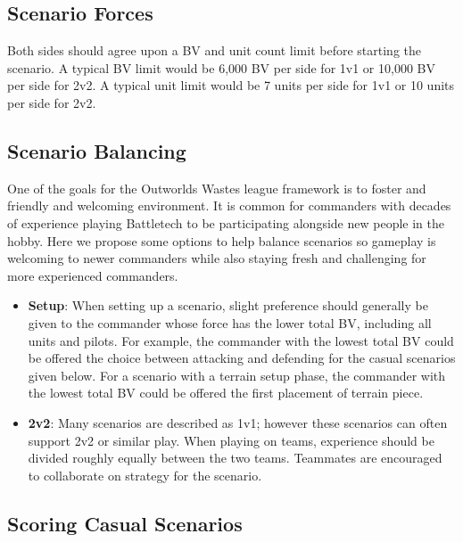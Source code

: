 \documentclass[UTF8]{article}
\begin{document}
\subsection{Scenario Forces}

Both sides should agree upon a BV and unit count limit before starting the scenario.
A typical BV limit would be 6,000 BV per side for 1v1 or 10,000 BV per side for 2v2.
A typical unit limit would be 7 units per side for 1v1 or 10 units per side for 2v2.\\

\subsection{Scenario Balancing}

One of the goals for the Outworlds Wastes league framework is to foster and friendly and welcoming environment.
It is common for commanders with decades of experience playing Battletech to be participating alongside new people in the hobby.
Here we propose some options to help balance scenarios so gameplay is welcoming to newer commanders while also staying fresh and challenging for more experienced commanders.\\

\begin{itemize}

\item {\bf Setup}: When setting up a scenario, slight preference should generally be given to the commander whose force has the lower total BV, including all units and pilots.
For example, the commander with the lowest total BV could be offered the choice between attacking and defending for the casual scenarios given below.
For a scenario with a terrain setup phase, the commander with the lowest total BV could be offered the first placement of terrain piece.

\item {\bf 2v2}: Many scenarios are described as 1v1; however these scenarios can often support 2v2 or similar play.
When playing on teams, experience should be divided roughly equally between the two teams.
Teammates are encouraged to collaborate on strategy for the scenario.

\end{itemize}

\subsection{Scoring Casual Scenarios}
\end{document}
